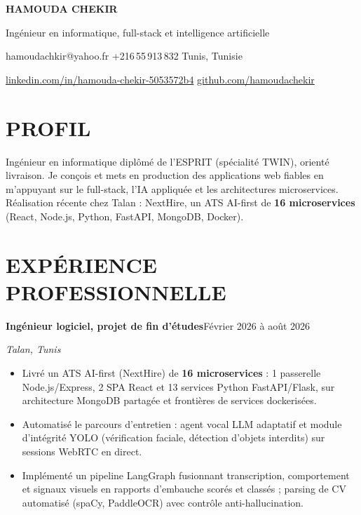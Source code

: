 \documentclass[10pt,a4paper]{article}
\newcommand{\kw}[1]{\mbox{#1}}
\newcommand{\TargetTitle}{Ingénieur en informatique, \kw{full-stack} et intelligence artificielle}
\newcommand{\job}[3]{%
 \par\noindent\textbf{\color{primary}#1}\hfill{\color{muted}\small #2}\par\vspace{0.4pt}%
 {\noindent\color{accent}\textit{\small #3}}\par\vspace{1pt}%
 \begin{itemize}[label=\textbullet, leftmargin=0.85em, itemsep=0.8pt, topsep=0.4pt, parsep=0pt, partopsep=0pt]
}
\newcommand{\contactsep}{\hspace{5pt}{\color{rulecolor}|}\hspace{5pt}}
\begin{document}
{\fontsize{16}{18}\selectfont\bfseries\color{primary}HAMOUDA CHEKIR\par\vspace{1pt}}
{\large\color{accent}\TargetTitle\par\vspace{3pt}}
{\small\color{muted}%
 hamoudachkir@yahoo.fr
 \contactsep
 +216\,55\,913\,832
 \contactsep
 Tunis, Tunisie
\par\vspace{1pt}}
{\small\color{muted}%
 \href{https://www.linkedin.com/in/hamouda-chekir-5053572b4}{linkedin.com/in/hamouda-chekir-5053572b4}
 \contactsep
 \href{https://github.com/hamoudachekir}{github.com/hamoudachekir}
\par\vspace{4pt}}

\section{PROFIL}
{\small Ingénieur en informatique diplômé de l'ESPRIT (spécialité TWIN), orienté livraison. Je conçois et mets en production des applications web fiables en m'appuyant sur le \kw{full-stack}, l'IA appliquée et les architectures microservices. Réalisation récente chez Talan : NextHire, un ATS \kw{AI-first} de \textbf{16 microservices} (React, Node.js, Python, FastAPI, MongoDB, Docker).}

\section{EXPÉRIENCE PROFESSIONNELLE}

\job{Ingénieur logiciel, projet de fin d'études}{Février 2026 à août 2026}{Talan, Tunis}
 \item Livré un ATS \kw{AI-first} (NextHire) de \textbf{16 microservices} : 1 passerelle Node.js/Express, 2 SPA React et 13 services Python FastAPI/Flask, sur architecture MongoDB partagée et frontières de services dockerisées.
 \item Automatisé le parcours d'entretien : agent vocal LLM adaptatif et module d'intégrité YOLO (vérification faciale, détection d'objets interdits) sur sessions WebRTC en direct.
 \item Implémenté un pipeline LangGraph fusionnant transcription, comportement et signaux visuels en rapports d'embauche scorés et classés ; parsing de CV automatisé (spaCy, PaddleOCR) avec contrôle \kw{anti-hallucination}.
\end{itemize}
\end{document}
